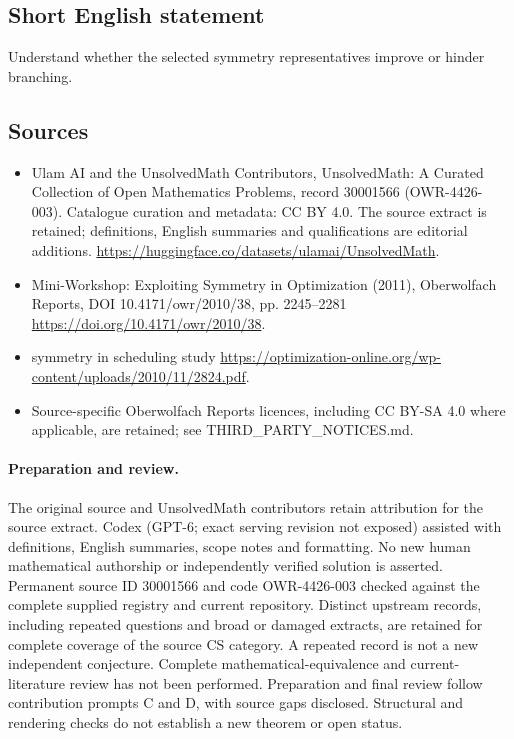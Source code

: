 \documentclass[11pt]{article}
\begin{document}
\subsection{Short English statement}
Understand whether the selected symmetry representatives improve or hinder branching.
\subsection{Sources}
\begin{itemize}
\item[\hypertarget{source:30001566:1}{S1}] Ulam AI and the UnsolvedMath Contributors, UnsolvedMath: A Curated Collection of Open Mathematics Problems, record 30001566 (OWR-4426-003). Catalogue curation and metadata: CC BY 4.0. The source extract is retained; definitions, English summaries and qualifications are editorial additions.
\url{https://huggingface.co/datasets/ulamai/UnsolvedMath}.
\item[\hypertarget{source:30001566:2}{S2}] Mini-Workshop: Exploiting Symmetry in Optimization (2011), Oberwolfach Reports, DOI 10.4171/owr/2010/38, pp. 2245--2281
\url{https://doi.org/10.4171/owr/2010/38}.
\item[\hypertarget{source:30001566:3}{S3}] symmetry in scheduling study
\url{https://optimization-online.org/wp-content/uploads/2010/11/2824.pdf}.
\item Source-specific Oberwolfach Reports licences, including CC BY-SA 4.0 where applicable, are retained; see THIRD\_PARTY\_NOTICES.md.
\end{itemize}
\paragraph{Preparation and review.}
The original source and UnsolvedMath contributors retain attribution for the source extract. Codex (GPT-6; exact serving revision not exposed) assisted with definitions, English summaries, scope notes and formatting. No new human mathematical authorship or independently verified solution is asserted. Permanent source ID 30001566 and code OWR-4426-003 checked against the complete supplied registry and current repository. Distinct upstream records, including repeated questions and broad or damaged extracts, are retained for complete coverage of the source CS category. A repeated record is not a new independent conjecture. Complete mathematical-equivalence and current-literature review has not been performed. Preparation and final review follow contribution prompts C and D, with source gaps disclosed. Structural and rendering checks do not establish a new theorem or open status.
\label{end:30001566}
\end{document}
